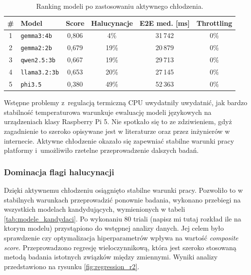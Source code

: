 \begin{table}[H]
  \centering
  \caption{Ranking modeli po zastosowaniu aktywnego chłodzenia.}
  \label{tab:ranking_run2}
  \begin{tabular}{clcccc}
    \hline
    \# & Model & Score & Halucynacje & E2E med. [ms] & Throttling \\
    \hline
    1 & \texttt{gemma3:4b}  & 0{,}806 & 4\%  & 31\,742 & 0\% \\
    2 & \texttt{gemma2:2b}  & 0{,}679 & 19\% & 20\,879 & 0\% \\
    3 & \texttt{qwen2.5:3b} & 0{,}667 & 19\% & 29\,713 & 0\% \\
    4 & \texttt{llama3.2:3b}& 0{,}653 & 20\% & 27\,145 & 0\% \\
    5 & \texttt{phi3.5}     & 0{,}380 & 49\% & 52\,363 & 0\% \\
    \hline
  \end{tabular}
\end{table}

Wstępne problemy z~regulacją termiczną CPU uwydatniły
uwydatnić, jak bardzo stabilność temperaturowa warunkuje
ewaluację modeli językowych na urządzeniach klasy Raspberry Pi 5. Nie spotkało się to ze zdziwieniem, gdyż zagadnienie to szeroko opisywane jest w literaturze \cite{Tummalapalli2026} oraz przez inżynierów w internecie. Aktywne chłodzenie okazało się zapewniać stabilne warunki pracy platformy i~umożliwiło rzetelne przeprowadzenie dalszych badań.

\subsubsection{Dominacja flagi halucynacji}
\label{subsec:hallucination_dominance}

Dzięki aktywnemu chłodzeniu osiągnięto stabilne warunki pracy. Pozwoliło to w stabilnych warunkach przeprowadzić ponownie badania, wykonano przebiegi na wszystkich modelach kandydujących, wymienionych w tabeli \ref{tab:modele_kandydaci}. Po wykonaniu 80 triali (napisz mi tutaj rozkład ile na ktorym modelu) przystąpiono do wstępnej analizy danych. Jej celem było sprawdzenie czy optymalizacja hiperparametrów wpływa na wartość \emph{composite score}. Przeprowadzono regresję wieloczynnikową, która jest szeroko stosowaną metodą badania istotnych związków między zmiennymi. Wyniki analizy przedstawiono na rysunku \ref{fig:regression_r2}.

